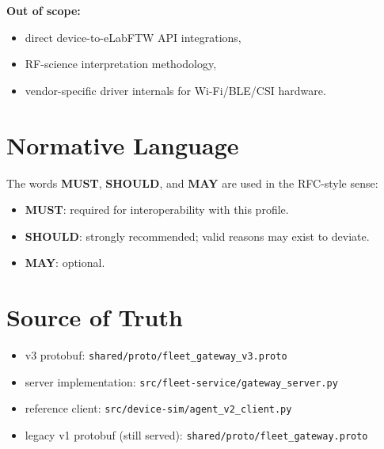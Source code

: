 \documentclass[11pt,a4paper]{article}
\begin{document}
\textbf{Out of scope:}
\begin{itemize}
  \item direct device-to-eLabFTW API integrations,
  \item RF-science interpretation methodology,
  \item vendor-specific driver internals for Wi-Fi/BLE/CSI hardware.
\end{itemize}

\section{Normative Language}
The words \textbf{MUST}, \textbf{SHOULD}, and \textbf{MAY} are used in the RFC-style sense:
\begin{itemize}
  \item \textbf{MUST}: required for interoperability with this profile.
  \item \textbf{SHOULD}: strongly recommended; valid reasons may exist to deviate.
  \item \textbf{MAY}: optional.
\end{itemize}

\section{Source of Truth}
\begin{itemize}
  \item v3 protobuf: \texttt{shared/proto/fleet\_gateway\_v3.proto}
  \item server implementation: \texttt{src/fleet-service/gateway\_server.py}
  \item reference client: \texttt{src/device-sim/agent\_v2\_client.py}
  \item legacy v1 protobuf (still served): \texttt{shared/proto/fleet\_gateway.proto}
\end{itemize}
\end{document}
